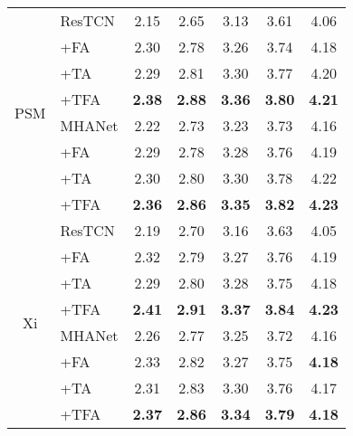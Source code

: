 \begin{table}[!htbp]
\begin{tabular}{@{}cl||ccccc@{}}
        \multirow{8}{*}{PSM}
        & ResTCN & 2.15 & 2.65 & 3.13 & 3.61 & 4.06 \\
        & +FA    & 2.30 & 2.78 & 3.26 & 3.74 & 4.18 \\
        & +TA    & 2.29 & 2.81 & 3.30 & 3.77 & 4.20 \\
        & +TFA   & \textbf{2.38} & \textbf{2.88} & \textbf{3.36} & \textbf{3.80} & \textbf{4.21} \\
        \cline{2-7}
        & MHANet & 2.22 & 2.73 & 3.23 & 3.73 & 4.16 \\
        & +FA    & 2.29 & 2.78 & 3.28 & 3.76 & 4.19 \\
        & +TA    & 2.30 & 2.80 & 3.30 & 3.78 & 4.22 \\
        & +TFA   & \textbf{2.36} & \textbf{2.86} & \textbf{3.35} & \textbf{3.82} & \textbf{4.23} \\
        \hline
        \hline
        
        \multirow{8}{*}{Xi}
        & ResTCN & 2.19 & 2.70 & 3.16 & 3.63 & 4.05 \\
        & +FA    & 2.32 & 2.79 & 3.27 & 3.76 & 4.19 \\
        & +TA    & 2.29 & 2.80 & 3.28 & 3.75 & 4.18 \\
        & +TFA   & \textbf{2.41} & \textbf{2.91} & \textbf{3.37} & \textbf{3.84} & \textbf{4.23} \\
        \cline{2-7}
        & MHANet & 2.26 & 2.77 & 3.25 & 3.72 & 4.16\\
        & +FA    & 2.33 & 2.82 & 3.27 & 3.75 & \textbf{4.18} \\
        & +TA    & 2.31 & 2.83 & 3.30 & 3.76 & 4.17\\
        & +TFA   & \textbf{2.37} & \textbf{2.86} & \textbf{3.34} & \textbf{3.79} & \textbf{4.18} \\
        \hline
    \end{tabular}
    \vspace{-0.8em}
\end{table}